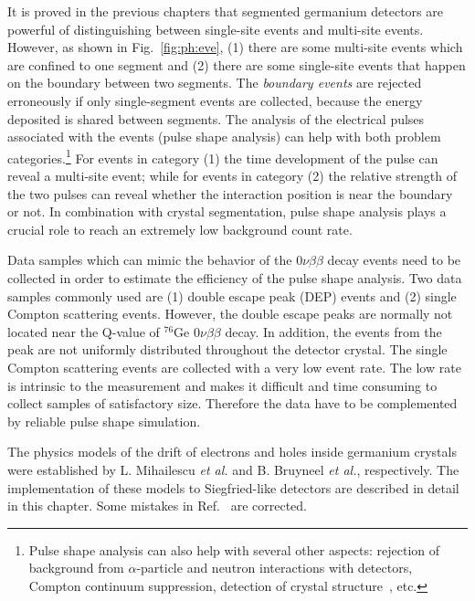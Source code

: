 It is proved in the previous chapters that segmented germanium detectors are powerful of distinguishing between single-site events and multi-site events. However, as shown in Fig.~\ref{fig:ph:eve}, (1) there are some multi-site events which are confined to one segment and (2) there are some single-site events that happen on the boundary between two segments. The \textit{boundary events} are rejected erroneously if only single-segment events are collected, because the energy deposited is shared between segments. The analysis of the electrical pulses associated with the events (pulse shape analysis) can help with both problem categories.\footnote{Pulse shape analysis can also help with several other aspects: rejection of background from $\alpha$-particle and neutron interactions with detectors, Compton continuum suppression\cite{comcon}, detection of crystal structure~\cite{agata}, etc.} For events in category (1) the time development of the pulse can reveal a multi-site event; while for events in category (2) the relative strength of the two pulses can reveal whether the interaction position is near the boundary or not. In combination with crystal segmentation, pulse shape analysis plays a crucial role to reach an extremely low background count rate.

Data samples which can mimic the behavior of the $0\nu\beta\beta$ decay events need to be collected in order to estimate the efficiency of the pulse shape analysis. Two data samples commonly used are (1) double escape peak (DEP) events and (2) single Compton scattering events\cite{scoms}. However, the double escape peaks are normally not located near the Q-value of $^{76}$Ge $0\nu\beta\beta$ decay. In addition, the events from the peak are not uniformly distributed throughout the detector crystal\cite{major}. The single Compton scattering events are collected with a very low event rate. The low rate is intrinsic to the measurement and makes it difficult and time consuming to collect samples of satisfactory size. Therefore the data have to be complemented by reliable pulse shape simulation.

The physics models of the drift of electrons and holes inside germanium crystals were established by L. Mihailescu \textit{et al.}\cite{miha} and B. Bruyneel \emph{et al.}\cite{bart}, respectively. The implementation of these models to Siegfried-like detectors are described in detail in this chapter. Some mistakes in Ref.~\cite{miha} are corrected.


